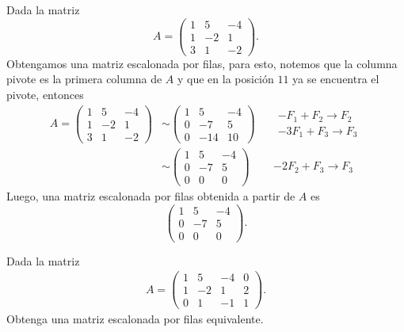 \documentclass[compacto,10pt]{pubciencias-notas}
\begin{document}
\begin{ejem}\hspace{0pt}\label{Ejem:EPF} Dada la matriz
\[
    A=\begin{pmatrix}
    1&5&-4\\
    1&-2&1\\
    3&1&-2
    \end{pmatrix}.
\]
Obtengamos una matriz escalonada por filas, para esto, notemos que la columna pivote es la primera columna de $A$ y que en la posición $11$ ya se encuentra el pivote, entonces
\begin{align*}
A=\begin{pmatrix}
1&5&-4\\
1&-2&1\\
3&1&-2
\end{pmatrix}
& \sim 
\begin{pmatrix}
1&5&-4\\
0&-7&5\\
0&-14&10
\end{pmatrix}
&& \begin{array}{c}
    -F_1+F_2\rightarrow F_2\\
    -3F_1+F_3\rightarrow F_3
\end{array}\\
& \sim 
\begin{pmatrix}
1&5&-4\\
0&-7&5\\
0&0&0
\end{pmatrix}
&& -2F_2+F_3\rightarrow F_3
\end{align*}
Luego, una matriz escalonada por filas obtenida a partir de $A$ es
\[
    \begin{pmatrix}
    1&5&-4\\
    0&-7&5\\
    0&0&0
    \end{pmatrix}.
\]
\end{ejem}

\begin{ejer}\hspace{0pt} Dada la matriz
\begin{align*}
A=\begin{pmatrix}
1&5&-4&0\\
1&-2&1&2\\
0&1&-1&1
\end{pmatrix}.
\end{align*}
Obtenga una matriz escalonada por filas equivalente.
\end{ejer}
\end{document}
